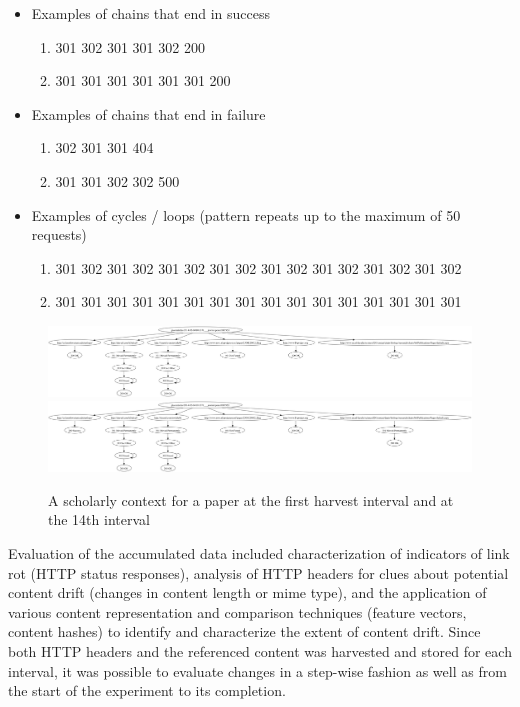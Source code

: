 \documentclass[12pt]{article}
\begin{document}
\begin{itemize}
\item Examples of chains that end in success
\begin{enumerate}
\item{301 302 301 301 302 200}
\item{301 301 301 301 301 301 200}
\end{enumerate}

\item Examples of chains that end in failure
\begin{enumerate}
\item{302 301 301 404}
\item{301 301 302 302 500}
\end{enumerate}

\item Examples of cycles / loops (pattern repeats up to the maximum of 50 requests)
\begin{enumerate}
\item{301 302 301 302 301 302 301 302 301 302 301 302 301 302 301 302}
\item{301 301 301 301 301 301 301 301 301 301 301 301 301 301 301 301 }
\end{enumerate}
\end{itemize}

\begin{figure}[ht!]
  \includegraphics[width=\linewidth,natwidth=610,natheight=642]{figure2_a.png}
  \includegraphics[width=\linewidth,natwidth=610,natheight=642]{figure2_b.png}
  \caption{A scholarly context for a paper at the first harvest interval and at the 14th interval}
  \label{fig:scholcontext}
\end{figure}

Evaluation of the accumulated data included characterization of indicators of link rot (HTTP status responses), analysis of HTTP headers for clues about potential content drift (changes in content length or mime type), and the application of various content representation and comparison techniques (feature vectors, content hashes) to identify and characterize the extent of content drift. Since both HTTP headers and the referenced content was harvested and stored for each interval, it was possible to evaluate changes in a step-wise fashion as well as from the start of the experiment to its completion. 
\end{document}
